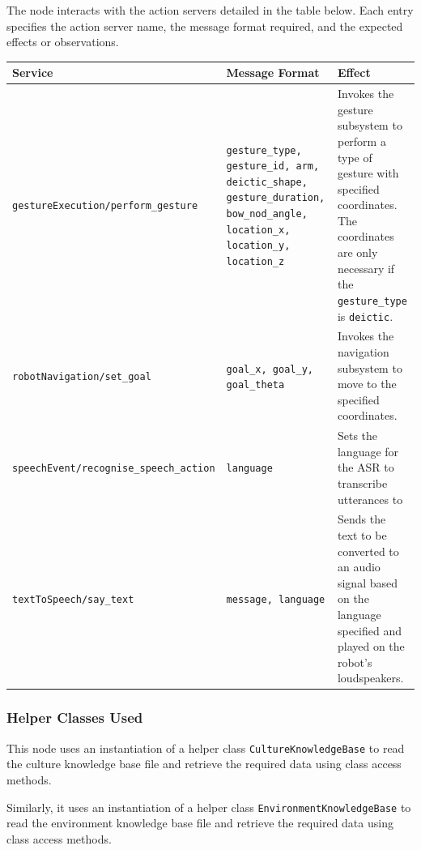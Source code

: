 \documentclass{CSSRforAfrica}
\begin{document}
The node interacts with the action servers detailed in the table below. Each entry specifies the action server name, the message format required, and the expected effects or observations.

\begin{center}
\begin{tabularx}{\linewidth}{| p{6.5cm} | X | X |}
\hline 
{\small Service }                               & {\small Message Format }                            &  {\small Effect}       \\
\hline
{\footnotesize \verb+gestureExecution/perform_gesture+}  & {\footnotesize \texttt{gesture\_type, gesture\_id, arm, deictic\_shape, gesture\_duration, bow\_nod\_angle, location\_x, location\_y, location\_z}}    & {\small Invokes the gesture subsystem to perform a type of gesture with specified coordinates. The coordinates are only necessary if the \texttt{gesture\_type} is \texttt{deictic}.} \\ 
\hline
{\footnotesize \verb+robotNavigation/set_goal+}  & {\footnotesize \texttt{goal\_x, goal\_y, goal\_theta}}    & {\small Invokes the navigation subsystem to move to the specified coordinates.} \\ 
\hline
{\footnotesize \verb+speechEvent/recognise_speech_action+}  & {\footnotesize \texttt{language}}    & {\small Sets the language for the ASR to transcribe utterances to} \\ 
\hline
{\footnotesize \verb+textToSpeech/say_text+}  & {\footnotesize \texttt{message, language}}    & {\small Sends the text to be converted to an audio signal based on the language specified and played on the robot's loudspeakers.} \\ 
\hline
\end{tabularx}
\end{center}


\subsubsection*{Helper Classes Used}
This node  uses an instantiation of a helper class {\small \verb+CultureKnowledgeBase+}  to read the culture knowledge base file and retrieve the required data using  class access methods. 

Similarly, it uses  an instantiation of a helper class {\small \verb+EnvironmentKnowledgeBase+}  to read the environment knowledge base file and retrieve the required data using  class access methods.  
\end{document}
